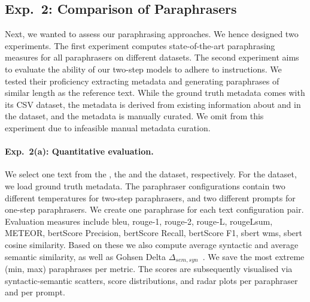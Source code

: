 \subsection{Exp.\ 2: Comparison of Paraphrasers}
\label{subsec:comp_paraphrasers_setup}

Next, we wanted to assess our paraphrasing approaches.
We hence designed two experiments.
The first experiment computes state-of-the-art paraphrasing measures for all paraphrasers on different datasets.
The second experiment aims to evaluate the ability of our two-step models to adhere to instructions.
We tested their proficiency extracting metadata and generating paraphrases of similar length as the reference text.
While the \dataBlog{} ground truth metadata comes with its CSV dataset, the \dataStudent{} metadata is derived from existing information about and in the dataset, and the \dataGutenberg{} metadata is manually curated.
We omit \dataPan{} from this experiment due to infeasible manual metadata curation.

\paragraph{Exp.\ 2(a): Quantitative evaluation.}

We select one text from the \dataBlog{}, the \dataGutenberg{} and the \dataStudent{} dataset, respectively.
For the \dataGutenberg{} dataset, we load ground truth metadata. %
The paraphraser configurations contain two different temperatures for two-step paraphrasers, and two different prompts for one-step paraphrasers.
We create one paraphrase for each text configuration pair.
Evaluation measures include \ac{bleu}, \ac{rouge}-1, \ac{rouge}-2, \ac{rouge}-L, \ac{rouge}\-Lsum, METEOR, \ac{bert}\-Score Precision, \ac{bert}\-Score Recall, \ac{bert}\-Score F1, \ac{sbert} \ac{wms}, \ac{sbert} cosine similarity.
Based on these we also compute average syntactic and average semantic similarity, as well as Gohsen Delta $\Delta_{sem,syn}$~\citep{gohsen_captions_2023}.
We save the most extreme (min, max) paraphrases per metric.
The scores are subsequently visualised via syntactic-semantic scatters, score distributions, and radar plots per paraphraser and per prompt. 


